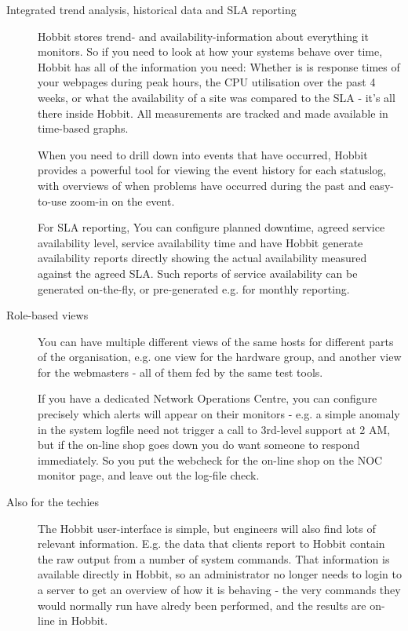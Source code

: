 \begin{description}
\item[Integrated trend analysis, historical data and SLA reporting]
  Hobbit stores trend- and availability-information about everything
  it monitors. So if you need to look at how your systems behave over
  time, Hobbit has all of the information you need: Whether is is
  response times of your webpages during peak hours, the CPU
  utilisation over the past 4 weeks, or what the availability of a
  site was compared to the SLA - it's all there inside Hobbit. All
  measurements are tracked and made available in time-based graphs. 


  When you need to drill down into events that have occurred, Hobbit
  provides a powerful tool for viewing the event history for each
  statuslog, with overviews of when problems have occurred during the
  past and easy-to-use zoom-in on the event. 

  For SLA reporting, You can configure planned downtime, agreed
  service availability level, service availability time and have
  Hobbit generate availability reports directly showing the actual
  availability measured against the agreed SLA. Such reports of
  service availability can be generated on-the-fly, or pre-generated
  e.g. for monthly reporting. 

\item[Role-based views] You can have multiple different views of the
  same hosts for different parts of the organisation, e.g. one view
  for the hardware group, and another view for the webmasters - all of
  them fed by the same test tools. 


  If you have a dedicated Network Operations Centre, you can configure
  precisely which alerts will appear on their monitors - e.g. a simple
  anomaly in the system logfile need not trigger a call to 3rd-level
  support at 2 AM, but if the on-line shop goes down you do want
  someone to respond immediately. So you put the webcheck for the
  on-line shop on the NOC monitor page, and leave out the log-file
  check. 
 

\item[Also for the techies] The Hobbit user-interface is simple, but
  engineers will also find lots of relevant information. E.g. the data
  that clients report to Hobbit contain the raw output from a number
  of system commands. That information is available directly in
  Hobbit, so an administrator no longer needs to login to a server to
  get an overview of how it is behaving - the very commands they would
  normally run have alredy been performed, and the results are on-line
  in Hobbit. 



\end{description}
